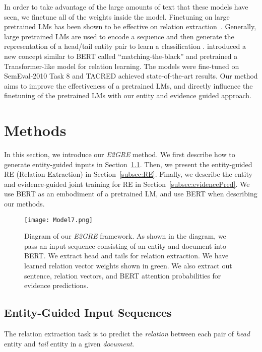 \documentclass[11pt,a4paper]{article}
\begin{document}
In order to take advantage of the large amounts of text that these models have seen, we finetune all of the weights inside the model. 
Finetuning on large pretrained LMs has been shown to be effective on relation extraction~\cite{wadden-etal-2019-entity}. 
Generally, large pretrained LMs are used to encode a sequence and then generate the representation of a head/tail entity pair to learn a classification \cite{SpBERT, docred}. \citet{baldini-soares-etal-2019-matching} introduced a new concept similar to BERT called ``matching-the-black'' and pretrained a Transformer-like model for relation learning. 
The models were fine-tuned on SemEval-2010 Task 8 and TACRED achieved state-of-the-art results.
Our method aims to improve the effectiveness of a pretrained LMs, and directly influence the finetuning of the pretrained LMs with our entity and evidence guided approach.


\section{Methods}

In this section, we introduce our {\em E2GRE} method. We first describe how to generate entity-guided inputs in Section~\ref{subsec:inputs}. Then, we present the entity-guided RE (Relation Extraction) in Section~\ref{subsec:RE}. 
Finally, we describe the entity and evidence-guided joint training for RE in Section~\ref{subsec:evidencePred}.
We use BERT as an embodiment of a pretrained LM, and use BERT when describing our methods.\begin{figure*}[t]
    \centering
    \texttt{[image: Model7.png]}
    \caption{Diagram of our {\em E2GRE} framework. As shown in the diagram, we pass an input sequence consisting of an entity and document into BERT. We extract head and tails for relation extraction. We have learned relation vector weights shown in green. We also extract out sentence, relation vectors, and BERT attention probabilities for evidence predictions.}

    \label{fig:model}
\end{figure*}
\subsection{Entity-Guided Input Sequences}\label{subsec:inputs}



The relation extraction task is to predict the {\em relation} between each pair of {\em head} entity and {\em tail} entity in a given {\em document}. 
\end{document}
